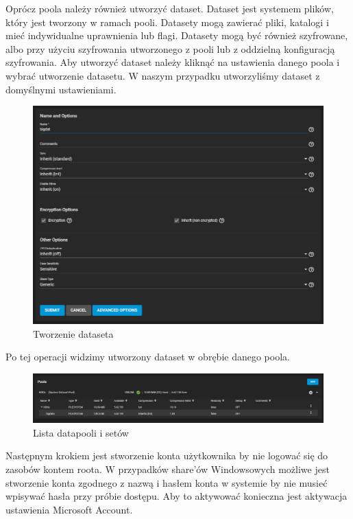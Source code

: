 \documentclass[12pt,a4paper]{article}
\newcommand{\<}{\langle}
\renewcommand{\>}{\rangle}
\theoremstyle{definition}
\begin{document}
Oprócz poola należy również utworzyć dataset. Dataset jest systemem plików, który jest tworzony w ramach pooli. Datasety mogą zawierać pliki, katalogi i mieć indywidualne uprawnienia lub flagi. Datasety mogą być również szyfrowane, albo przy użyciu szyfrowania utworzonego z pooli lub z oddzielną konfiguracją szyfrowania.
Aby utworzyć dataset należy kliknąć na ustawienia danego poola i wybrać utworzenie datasetu. W naszym przypadku utworzyliśmy dataset z domyślnymi ustawieniami.

\begin{figure}[H]
    \centering
    \includegraphics[width=\linewidth]{img/ss_truenas/26.png}
    \caption{Tworzenie dataseta}
    \label{dataset_creating}
\end{figure}

Po tej operacji widzimy utworzony dataset w obrębie danego poola.

\begin{figure}[H]
    \centering
    \includegraphics[width=\linewidth]{img/ss_truenas/27.png}
    \caption{Lista datapooli i setów}
    \label{pool_list_group}
\end{figure}

Następnym krokiem jest stworzenie konta użytkownika by nie logować się do zasobów kontem roota. W przypadków share'ów Windowsowych możliwe jest stworzenie konta zgodnego z nazwą i hasłem konta w systemie by nie musieć wpisywać hasła przy próbie dostępu. Aby to aktywować konieczna jest aktywacja ustawienia Microsoft Account.
\end{document}
